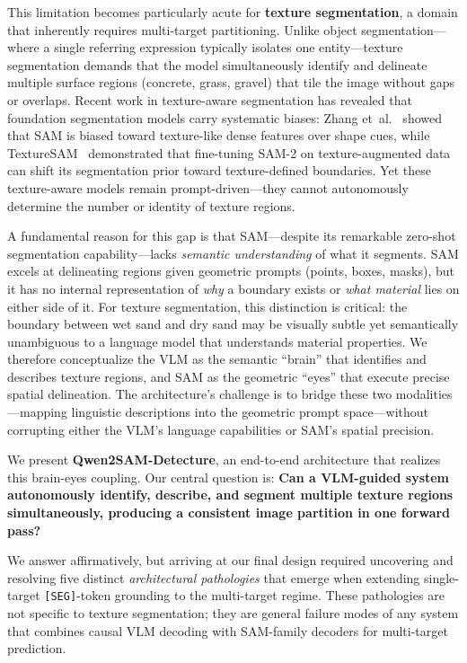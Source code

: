 \documentclass{article}
\begin{document}
This limitation becomes particularly acute for \textbf{texture segmentation}, a domain that inherently requires multi-target partitioning. Unlike object segmentation---where a single referring expression typically isolates one entity---texture segmentation demands that the model simultaneously identify and delineate multiple surface regions (concrete, grass, gravel) that tile the image without gaps or overlaps. Recent work in texture-aware segmentation has revealed that foundation segmentation models carry systematic biases: Zhang et~al.~\cite{samtexturebias} showed that SAM is biased toward texture-like dense features over shape cues, while TextureSAM~\cite{texturesam} demonstrated that fine-tuning SAM-2 on texture-augmented data can shift its segmentation prior toward texture-defined boundaries. Yet these texture-aware models remain prompt-driven---they cannot autonomously determine the number or identity of texture regions.

A fundamental reason for this gap is that SAM---despite its remarkable zero-shot segmentation capability---lacks \emph{semantic understanding} of what it segments. SAM excels at delineating regions given geometric prompts (points, boxes, masks), but it has no internal representation of \emph{why} a boundary exists or \emph{what material} lies on either side of it. For texture segmentation, this distinction is critical: the boundary between wet sand and dry sand may be visually subtle yet semantically unambiguous to a language model that understands material properties. We therefore conceptualize the VLM as the semantic ``brain'' that identifies and describes texture regions, and SAM as the geometric ``eyes'' that execute precise spatial delineation. The architecture's challenge is to bridge these two modalities---mapping linguistic descriptions into the geometric prompt space---without corrupting either the VLM's language capabilities or SAM's spatial precision.

We present \textbf{Qwen2SAM-Detecture}, an end-to-end architecture that realizes this brain-eyes coupling. Our central question is: \textbf{Can a VLM-guided system autonomously identify, describe, and segment multiple texture regions simultaneously, producing a consistent image partition in one forward pass?}

We answer affirmatively, but arriving at our final design required uncovering and resolving five distinct \emph{architectural pathologies} that emerge when extending single-target \texttt{[SEG]}-token grounding to the multi-target regime. These pathologies are not specific to texture segmentation; they are general failure modes of any system that combines causal VLM decoding with SAM-family decoders for multi-target prediction.
\end{document}
